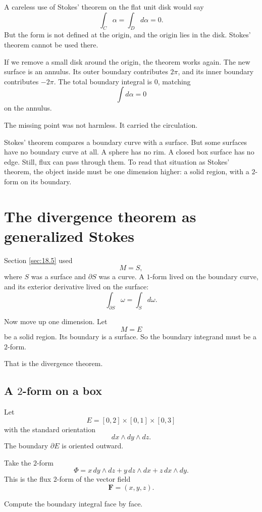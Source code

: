 A careless use of Stokes' theorem on the flat unit disk would say
\[
    \int_C\alpha=\int_D d\alpha=0.
\]
But the form is not defined at the origin, and the origin lies in the disk.  Stokes'
theorem cannot be used there.

If we remove a small disk around the origin, the theorem works again.  The new surface
is an annulus.  Its outer boundary contributes \(2\pi\), and its inner boundary
contributes \(-2\pi\).  The total boundary integral is \(0\), matching
\[
    \int d\alpha=0
\]
on the annulus.

The missing point was not harmless.  It carried the circulation.

Stokes' theorem compares a boundary curve with a surface.  But some surfaces have no
boundary curve at all.  A sphere has no rim.  A closed box surface has no edge.  Still,
flux can pass through them.  To read that situation as Stokes' theorem, the object
inside must be one dimension higher: a solid region, with a \(2\)-form on its boundary.

\section{The divergence theorem as generalized Stokes}
\label{sec:18.6}

Section \ref{sec:18.5} used
\[
    M=S,
\]
where \(S\) was a surface and \(\partial S\) was a curve.  A \(1\)-form lived on the
boundary curve, and its exterior derivative lived on the surface:
\[
    \int_{\partial S}\omega=\int_S d\omega.
\]

Now move up one dimension.  Let
\[
    M=E
\]
be a solid region.  Its boundary is a surface.  So the boundary integrand must be a
\(2\)-form.

That is the divergence theorem.

\subsection{A \(2\)-form on a box}

Let
\[
    E=[0,2]\times[0,1]\times[0,3]
\]
with the standard orientation
\[
    dx\wedge dy\wedge dz.
\]
The boundary \(\partial E\) is oriented outward.

Take the \(2\)-form
\[
\boxed{
    \Phi=x\,dy\wedge dz+y\,dz\wedge dx+z\,dx\wedge dy.
}
\]
This is the flux \(2\)-form of the vector field
\[
    \mathbf F=(x,y,z).
\]

Compute the boundary integral face by face.

